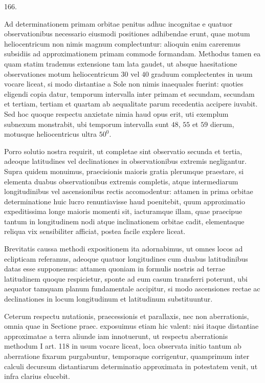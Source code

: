 \begin{center}\hypertarget{native-229-article166}{}166.\end{center}
Ad determinationem primam orbitae penitus adhuc incognitae e quatuor
observationibus necessario eiusmodi positiones adhibendae erunt, quae motum
heliocentricum non nimis magnum complectuntur: alioquin enim careremus
subsidiis ad approximationem primam commode formandam. Methodus tamen ea
quam statim trademus extensione tam lata gaudet, ut absque haesitatione
observationes motum heliocentricum $30$ vel $40$ graduum complectentes in
usum vocare liceat, si modo distantiae a Sole non nimis inaequales fuerint:
quoties eligendi copia datur, temporum intervalla inter primam et secundam,
secundam et tertiam, tertiam et quartam ab aequalitate parum recedentia accipere
iuvabit. Sed hoc quoque respectu anxietate nimia haud opus erit, uti exemplum
subnexum monstrabit, ubi temporum intervalla sunt $48$, $55$ et $59$ dierum,
motusque heliocentricus ultra $50^0$.

Porro solutio nostra requirit, ut completae sint observatio secunda et tertia,
adeoque latitudines vel declinationes in observationibus extremis negligantur.
Supra quidem monuimus, praecisionis maioris gratia plerumque praestare,
si elementa duabus observationibus extremis completis, atque intermediarum
longitudinibus vel ascensionibus rectis accomodentur: attamen in prima orbitae
determinatione huic lucro renuntiavisse haud poenitebit, quum approximatio
expeditissima longe maioris momenti sit, iacturamque illam, quae praecipue
tantum in longitudinem nodi atque inclinationem orbitae cadit, elementaque
reliqua vix sensibiliter afficiat, postea facile explere liceat.

Brevitatis caussa methodi expositionem ita adornabimus, ut omnes locos ad
eclipticam referamus, adeoque quatuor longitudines cum duabus latitudinibus
datas esse supponemus: attamen quoniam in formulis nostris ad terrae latitudinem
quoque respicietur, sponte ad eum casum transferri poterunt, ubi aequator
tamquam planum fundamentale accipitur, si modo ascensiones rectae ac declinationes
in locum longitudinum et latitudinum substituuntur.

Ceterum respectu nutationis, praecessionis et parallaxis, nec non aberrationis,
omnia quae in Sectione praec. exposuimus etiam hic valent: nisi itaque
distantiae approximatae a terra aliunde iam innotuerunt, ut respectu aberrationis
methodum I art. 118 in usum vocare liceat, loca observata initio tantum ab
aberratione fixarum purgabuntur, temporaque corrigentur, quamprimum inter
calculi decursum distantiarum determinatio approximata in potestatem venit,
ut infra clarius elucebit.
